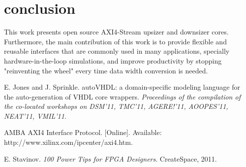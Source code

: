\documentclass[10pt, conference, compsocconf]{IEEEtran}
\begin{document}
\section{conclusion}
This work presents open source AXI4-Stream upsizer and downsizer cores. Furthermore, the main contribution of this work is to provide flexible and reusable interfaces that are commonly used in many applications, specially hardware-in-the-loop simulations, and improve productivity by stopping "reinventing the wheel" every time data width conversion is needed.



%
%




%
%
%
\begin{thebibliography}{1}

E. Jones and J. Sprinkle. autoVHDL: a domain-specific modeling language for the auto-generation of VHDL core wrappers. \emph{Proceedings of the compilation of the co-located workshops on DSM'11, TMC'11, AGERE!'11, AOOPES'11, NEAT'11, VMIL'11}.

AMBA AXI4 Interface Protocol. [Online]. Available: http://www.xilinx.com/ipcenter/axi4.htm.


E. Stavinov. \emph{100 Power Tips for FPGA Designers}. CreateSpace, 2011.


\end{thebibliography}

\end{document}
